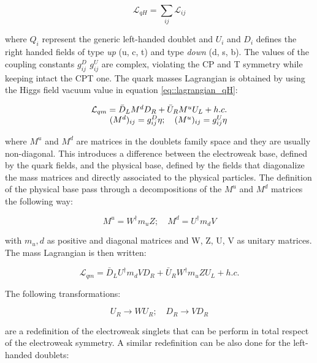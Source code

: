 \begin{equation}
\mathcal{L}_{qH} = \sum_{ij}\mathcal{L}_{ij}
\label{eq::lagrangian_qH}
\end{equation}

where $Q_{i}$ represent the generic left-handed doublet and $U_{i}$ and $D_{i}$ defines the right handed fields of type \textit{up} (u, c, t) and type \textit{down} (d, s, b). The values of the coupling constants $g^{D}_{ij}$ $g^{U}_{ij}$ are complex, violating the CP and T symmetry while keeping intact the CPT one.
The quark masses Lagrangian is obtained by using the Higgs field vacuum value in equation \ref{eq::lagrangian_qH}:

\begin{equation}
\begin{array}{r c l}
\mathcal{L}_{qm} = \bar{D}_{L}M^{d}D_{R} + \bar{U}_{R}M^{u}U_{L} + h.c. \\
(M^{d})_{ij} = g^{D}_{ij}\eta; \quad (M^{u})_{ij} = g^{U}_{ij}\eta
\end{array}
\end{equation}

where $M^{u}$ and  $M^{d}$ are matrices in the doublets family space and they are usually non-diagonal. This introduces a difference between the electroweak base, defined by the quark fields, and the physical base, defined by the fields that diagonalize the mass matrices and directly associated to the physical particles.
The definition of the physical base pass through a decompositions of the $M^{u}$ and $M^{d}$ matrices the following way:

\begin{equation}
M^{u} = W^{\dagger}m_{u}Z; \quad M^{d} = U^{\dagger}m_{d}V
\end{equation}

with $m_u,d$ as positive and diagonal matrices and W, Z, U, V as unitary matrices. The mass Lagrangian is then written:

\begin{equation}
\mathcal{L}_{qm} = \bar{D}_{L}U^{\dagger}m_{d}VD_{R} + \bar{U}_{R}W^{\dagger}m_{u}ZU_{L} + h.c.
\end{equation}

The following transformations:

\begin{equation}
U_{R} \longrightarrow W U_{R}; \quad D_{R} \longrightarrow V D_{R}
\end{equation}

are a redefinition of the electroweak singlets that can be perform in total respect of the electroweak symmetry. A similar redefinition can be also done for the left-handed doublets:


